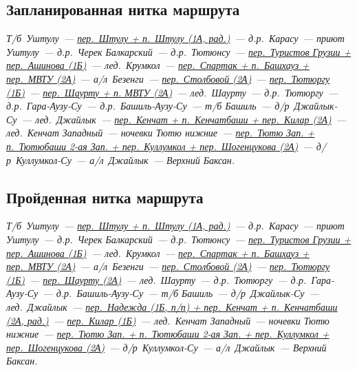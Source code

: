 	\subsection{Запланированная нитка маршрута}\label{subsec:planned_route}
		\renewcommand{\bfdefault}{bx}
		\textit{
			Т/б~Уштулу~---
			\hyperref[subsec:main_obstacles]{пер.~Штулу + п.~Штулу (1А, рад.)}~---
			д.р.~Карасу~---
			приют Уштулу~---
			д.р.~Черек Балкарский~---
			д.р.~Тютюнсу~---
			\hyperref[subsec:main_obstacles]{пер.~Туристов Грузии + пер.~Ашинова (1Б)}~---
			лед.~Крумкол~---
			\hyperref[subsec:main_obstacles]{пер.~Спартак + п.~Башхауз + пер.~МВТУ (2А)}~---
			а/л~Безенги~---
			\hyperref[subsec:main_obstacles]{пер.~Столбовой (2А)}~---
			\hyperref[subsec:main_obstacles]{пер.~Тютюргу (1Б)}~---
			\hyperref[subsec:main_obstacles]{пер.~Шаурту + п. МВТУ (2А)}~---
			лед.~Шаурту~---
			д.р.~Тютюргу~---
			д.р.~Гара-Аузу-Су~---
			д.р.~Башиль-Аузу-Су~---
			т/б Башиль~---
			д/р~Джайлык-Су~---
			лед.~Джайлык~---
			\hyperref[subsec:main_obstacles]{пер.~Кенчат + п.~Кенчатбаши + пер.~Килар (2А)}~---
			лед.~Кенчат Западный~---
			ночевки Тютю нижние~---
			\hyperref[subsec:main_obstacles]{пер.~Тютю Зап. + п.~Тютюбаши 2-ая Зап. + пер.~Куллумкол + пер.~Шогенцукова (2А)}~---
			д/р~Куллумкол-Су~---
			а/л~Джайлык~---
			Верхний Баксан.
			}
	
	\subsection{Пройденная нитка маршрута}\label{subsec:real_route}
		\textit{
			Т/б~Уштулу~---
			\hyperref[subsec:main_obstacles]{пер.~Штулу + п.~Штулу (1А, рад.)}~---
			д.р.~Карасу~---
			приют Уштулу~---
			д.р.~Черек Балкарский~---
			д.р.~Тютюнсу~---
			\hyperref[subsec:main_obstacles]{пер.~Туристов Грузии + пер.~Ашинова (1Б)}~---
			лед.~Крумкол~---
			\hyperref[subsec:main_obstacles]{пер.~Спартак + п.~Башхауз + пер.~МВТУ (2А)}~---
			а/л~Безенги~---
			\hyperref[subsec:main_obstacles]{пер.~Столбовой (2А)}~---
			\hyperref[subsec:main_obstacles]{пер.~Тютюргу (1Б)}~---
			\hyperref[subsec:main_obstacles]{пер.~Шаурту (2А)}~---
			лед.~Шаурту~---
			д.р.~Тютюргу~---
			д.р.~Гара-Аузу-Су~---
			д.р.~Башиль-Аузу-Су~---
			т/б Башиль~---
			д/р~Джайлык-Су~---
			лед.~Джайлык~---
			\hyperref[subsec:main_obstacles]{пер.~Надежда (1Б, п/п) + пер.~Кенчат + п.~Кенчатбаши (2А, рад.)}~---
			\hyperref[subsec:main_obstacles]{пер.~Килар (1Б)}~---
			лед.~Кенчат Западный~---
			ночевки Тютю нижние~---
			\hyperref[subsec:main_obstacles]{пер.~Тютю Зап. + п.~Тютюбаши 2-ая Зап. + пер.~Куллумкол + пер.~Шогенцукова (2А)}~---
			д/р~Куллумкол-Су~---
			а/л~Джайлык~---
			Верхний Баксан.
			}
		\renewcommand{\bfdefault}{b}

